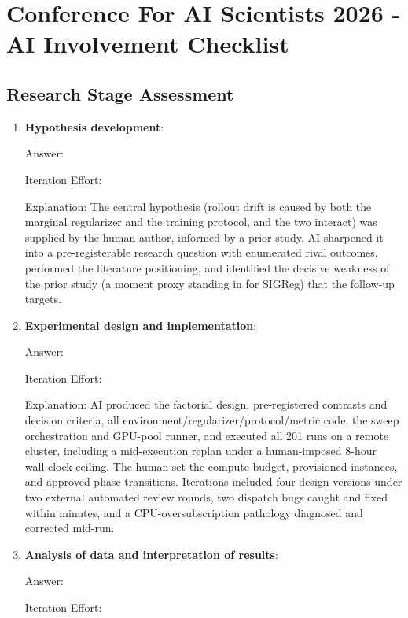 \section*{Conference For AI Scientists 2026 - AI Involvement Checklist}
\label{checklist_ai_involvement}

\subsection*{Research Stage Assessment}

\begin{enumerate}

    \item \textbf{Hypothesis development}:

    Answer: \involvementB{}

    Iteration Effort: \iterationLow{}

    Explanation: The central hypothesis (rollout drift is caused by both the marginal regularizer and the training protocol, and the two interact) was supplied by the human author, informed by a prior study. AI sharpened it into a pre-registerable research question with enumerated rival outcomes, performed the literature positioning, and identified the decisive weakness of the prior study (a moment proxy standing in for SIGReg) that the follow-up targets.

    \item \textbf{Experimental design and implementation}:

    Answer: \involvementD{}

    Iteration Effort: \iterationMedium{}

    Explanation: AI produced the factorial design, pre-registered contrasts and decision criteria, all environment/regularizer/protocol/metric code, the sweep orchestration and GPU-pool runner, and executed all 201 runs on a remote cluster, including a mid-execution replan under a human-imposed 8-hour wall-clock ceiling. The human set the compute budget, provisioned instances, and approved phase transitions. Iterations included four design versions under two external automated review rounds, two dispatch bugs caught and fixed within minutes, and a CPU-oversubscription pathology diagnosed and corrected mid-run.

    \item \textbf{Analysis of data and interpretation of results}:

    Answer: \involvementD{}

    Iteration Effort: \iterationMedium{}


\end{enumerate}

